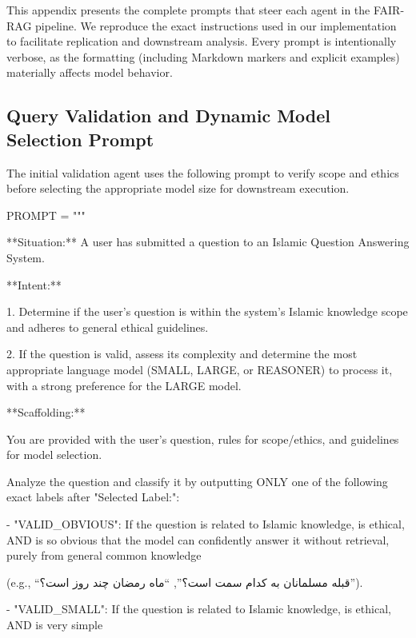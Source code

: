 \documentclass[11pt]{article}
\newcommand{\fa}[1]{\textfarsi{#1}}
\begin{document}
This appendix presents the complete prompts that steer each agent in the FAIR-RAG pipeline. We reproduce the exact instructions used in our implementation to facilitate replication and downstream analysis. Every prompt is intentionally verbose, as the formatting (including Markdown markers and explicit examples) materially affects model behavior.

\subsection{Query Validation and Dynamic Model Selection Prompt}

The initial validation agent uses the following prompt to verify scope and ethics before selecting the appropriate model size for downstream execution.

\begin{PromptBlock}
PROMPT = """

**Situation:** A user has submitted a question to an Islamic Question Answering System.

**Intent:**

1. Determine if the user's question is within the system's Islamic knowledge scope and adheres to general ethical guidelines.

2. If the question is valid, assess its complexity and determine the most appropriate language model (SMALL, LARGE, or REASONER) to process it, with a strong preference for the LARGE model.

**Scaffolding:**

You are provided with the user's question, rules for scope/ethics, and guidelines for model selection.

Analyze the question and classify it by outputting ONLY one of the following exact labels after "Selected Label:":

- "VALID_OBVIOUS": If the question is related to Islamic knowledge, is ethical, AND is so obvious that the model can confidently answer it without retrieval, purely from general common knowledge
\end{PromptBlock}

\fa{(e.g., ``قبله مسلمانان به کدام سمت است؟'', ``ماه رمضان چند روز است؟'').}

\begin{PromptBlock}

- "VALID_SMALL": If the question is related to Islamic knowledge, is ethical, AND is very simple
\end{PromptBlock}
\end{document}
